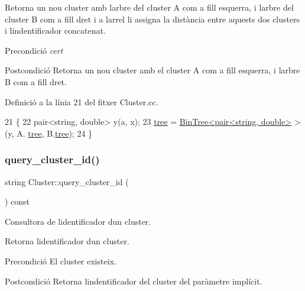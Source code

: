 Retorna un nou cluster amb l\textquotesingle{}arbre del cluster A com a fill esquerra, i l\textquotesingle{}arbre del cluster B com a fill dret i a l\textquotesingle{}arrel li assigna la distància entre aquests dos clusters i l\textquotesingle{}indentificador concatenat.

\begin{DoxyPrecond}{Precondició}
{\itshape cert} 
\end{DoxyPrecond}
\begin{DoxyPostcond}{Postcondició}
Retorna un nou cluster amb el cluster A com a fill esquerra, i l\textquotesingle{}arbre B com a fill dret. 
\end{DoxyPostcond}


Definició a la línia 21 del fitxer Cluster.\+cc.


\begin{DoxyCode}
21                                                                                     \{
22     pair<string, double> y(a, x);
23     \hyperlink{class_cluster_a3bfc63bfed216dd410ec687fe533c34c}{tree} = \hyperlink{class_bin_tree}{BinTree<pair<string, double>} > (y, A.
      \hyperlink{class_cluster_a3bfc63bfed216dd410ec687fe533c34c}{tree}, B.\hyperlink{class_cluster_a3bfc63bfed216dd410ec687fe533c34c}{tree});
24 \}
\end{DoxyCode}
\mbox{\label{class_cluster_a7e077596f7eb4f2bdf2847d65fa37654}} 
\subsubsection{\texorpdfstring{query\+\_\+cluster\+\_\+id()}{query\_cluster\_id()}}
{\footnotesize\ttfamily string Cluster\+::query\+\_\+cluster\+\_\+id (\begin{DoxyParamCaption}{ }\end{DoxyParamCaption}) const}



Consultora de l\textquotesingle{}identificador d\textquotesingle{}un cluster. 

Retorna l\textquotesingle{}identificador d\textquotesingle{}un cluster.

\begin{DoxyPrecond}{Precondició}
El cluster existeix. 
\end{DoxyPrecond}
\begin{DoxyPostcond}{Postcondició}
Retorna l\textquotesingle{}indentificador del cluster del paràmetre implícit. 
\end{DoxyPostcond}


